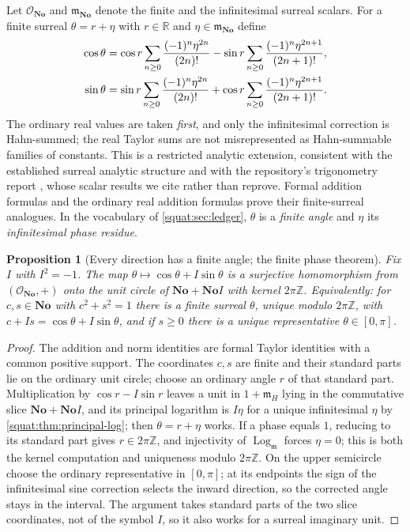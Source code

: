 \documentclass[11pt,letterpaper]{article}
\numberwithin{equation}{section}
\newtheorem{proposition}[proposition]{Proposition}
\theoremstyle{definition}
\theoremstyle{remark}
\newcommand{\No}{\mathbf{No}}
\newcommand{\R}{\mathbb R}
\newcommand{\Z}{\mathbb Z}
\newcommand{\OO}{\mathcal O}
\newcommand{\mm}{\mathfrak m}
\newcommand{\Log}{\operatorname{Log}}
\newcommand{\Logm}{\Log_{\mm}}
\begin{document}
Let $\OO_{\No}$ and $\mm_{\No}$ denote the finite and the infinitesimal surreal scalars.
For a finite surreal $\theta=r+\eta$ with $r\in\R$ and $\eta\in\mm_{\No}$ define
\begin{align}\label{squat:eq:finite-trig}
 \cos\theta&=\cos r\sum_{n\ge0}\frac{(-1)^n\eta^{2n}}{(2n)!}
            -\sin r\sum_{n\ge0}\frac{(-1)^n\eta^{2n+1}}{(2n+1)!},\\
 \sin\theta&=\sin r\sum_{n\ge0}\frac{(-1)^n\eta^{2n}}{(2n)!}
            +\cos r\sum_{n\ge0}\frac{(-1)^n\eta^{2n+1}}{(2n+1)!}.\notag
\end{align}
The ordinary real values are taken \emph{first}, and only the infinitesimal correction is
Hahn-summed; the real Taylor sums are not misrepresented as Hahn-summable families of
constants. This is a restricted analytic extension, consistent with the established
surreal analytic structure \cite{vdDE,EK} and with the repository's trigonometry report
\cite{RepoTrig}, whose scalar results we cite rather than reprove. Formal addition formulas
and the ordinary real addition formulas prove their finite-surreal analogues. In the
vocabulary of \cref{squat:sec:ledger}, $\theta$ is a \emph{finite angle} and $\eta$ its
\emph{infinitesimal phase residue}.

\begin{proposition}[Every direction has a finite angle; the finite phase theorem]
\label{squat:prop:finiteangles}
Fix $I$ with $I^2=-1$. The map $\theta\mapsto\cos\theta+I\sin\theta$ is a surjective
homomorphism from $(\OO_{\No},+)$ onto the unit circle of $\No+\No I$ with kernel
$2\pi\Z$. Equivalently: for $c,s\in\No$ with $c^2+s^2=1$ there is a \emph{finite} surreal
$\theta$, unique modulo $2\pi\Z$, with $c+Is=\cos\theta+I\sin\theta$, and if $s\ge0$ there
is a unique representative $\theta\in[0,\pi]$.
\end{proposition}
\begin{proof}
The addition and norm identities are formal Taylor identities with a common positive
support. The coordinates $c,s$ are finite and their standard parts lie on the ordinary unit
circle; choose an ordinary angle $r$ of that standard part. Multiplication by
$\cos r-I\sin r$ leaves a unit in $1+\mm_H$ lying in the commutative slice $\No+\No I$, and
its principal logarithm is $I\eta$ for a unique infinitesimal $\eta$ by
\cref{squat:thm:principal-log}; then $\theta=r+\eta$ works. If a phase equals $1$, reducing
to its standard part gives $r\in2\pi\Z$, and injectivity of $\Logm$ forces $\eta=0$; this
is both the kernel computation and uniqueness modulo $2\pi\Z$. On the upper semicircle
choose the ordinary representative in $[0,\pi]$; at its endpoints the sign of the
infinitesimal sine correction selects the inward direction, so the corrected angle stays in
the interval. The argument takes standard parts of the two slice coordinates, not of the
symbol $I$, so it also works for a surreal imaginary unit.
\end{proof}
\end{document}
